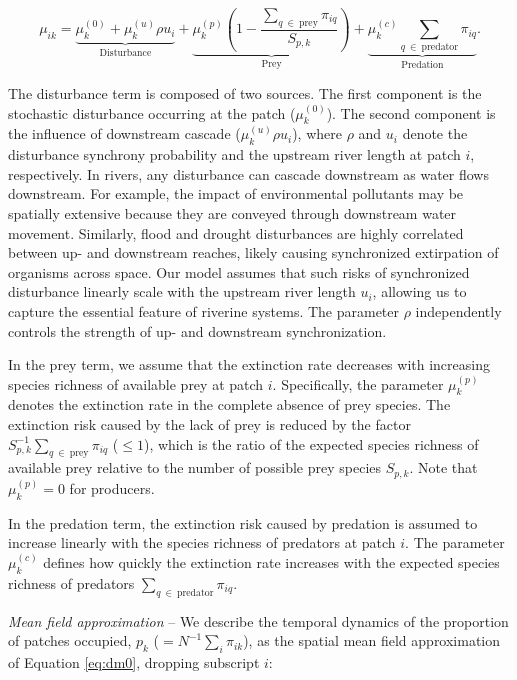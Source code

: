 \documentclass[11pt, class=article, crop=false]{standalone}
\begin{document}
\begin{equation}
    \mu_{ik} = 
        \underbrace{\mu_{k}^{(0)} + \mu_{k}^{(u)} \rho u_i}_{\text{Disturbance}} + 
        \underbrace{\mu_{k}^{(p)} \left(1 - \frac{\sum_{q~\in~\text{prey}} \pi_{iq}}{S_{p, k}} \right)}_{\text{Prey}} + 
        \underbrace{\mu_{k}^{(c)} \sum_{q~\in~\text{predator}} \pi_{iq}}_{\text{Predation}}.
    \label{eq:extn}
\end{equation}

The disturbance term is composed of two sources. The first component is the stochastic disturbance occurring at the patch ($\mu_{k}^{(0)}$).
The second component is the influence of downstream cascade ($\mu_{k}^{(u)} \rho u_i$), where $\rho$ and $u_i$ denote the disturbance synchrony probability and the upstream river length at patch $i$, respectively.
In rivers, any disturbance can cascade downstream as water flows downstream.
For example, the impact of environmental pollutants may be spatially extensive because they are conveyed through downstream water movement.
Similarly, flood and drought disturbances are highly correlated between up- and downstream reaches, likely causing synchronized extirpation of organisms across space.
Our model assumes that such risks of synchronized disturbance linearly scale with the upstream river length $u_i$, allowing us to capture the essential feature of riverine systems.
The parameter $\rho$ independently controls the strength of up- and downstream synchronization.

In the prey term, we assume that the extinction rate decreases with increasing species richness of available prey at patch $i$.
Specifically, the parameter $\mu_{k}^{(p)}$ denotes the extinction rate in the complete absence of prey species.
The extinction risk caused by the lack of prey is reduced by the factor $S_{p, k}^{-1} \sum_{q~\in~\text{prey}} \pi_{iq}$ ($\le 1$), which is the ratio of the expected species richness of available prey relative to the number of possible prey species $S_{p, k}$.
Note that $\mu_{k}^{(p)} = 0$ for producers.

In the predation term, the extinction risk caused by predation is assumed to increase linearly with the species richness of predators at patch $i$.
The parameter $\mu_{k}^{(c)}$ defines how quickly the extinction rate increases with the expected species richness of predators $\sum_{q~\in~\text{predator}} \pi_{iq}$.

\textit{Mean field approximation} --
We describe the temporal dynamics of the proportion of patches occupied, $p_k$ ($= N^{-1} \sum_i \pi_{ik}$), as the spatial mean field approximation of Equation \ref{eq:dm0}, dropping subscript $i$:
\end{document}
